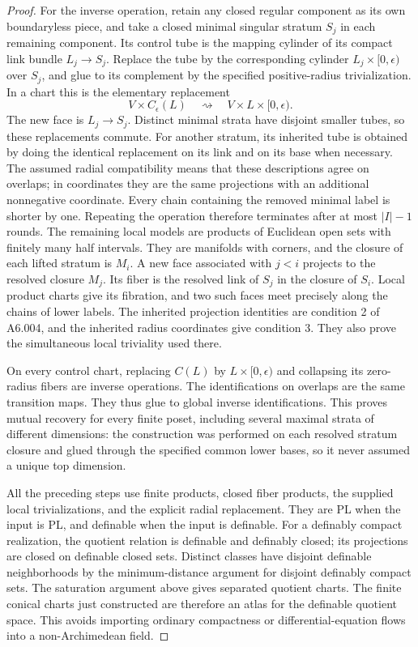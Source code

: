 \begin{proof}
For the inverse operation, retain any closed regular component
as its own boundaryless piece, and take a closed minimal singular
stratum $S_j$ in each remaining component.
Its control tube is the mapping cylinder of its compact link
bundle $L_j\to S_j$. Replace the tube by the corresponding
cylinder $L_j\times[0,\epsilon)$ over $S_j$, and glue to its
complement by the specified positive-radius trivialization.
In a chart this is the elementary replacement
\[
 V\times C_{\epsilon}(L)\quad\rightsquigarrow\quad
 V\times L\times[0,\epsilon).
\]
The new face is $L_j\to S_j$. Distinct minimal strata have
disjoint smaller tubes, so these replacements commute.
For another stratum, its inherited tube is obtained by doing
the identical replacement on its link and on its base when
necessary. The assumed radial compatibility means that these
descriptions agree on overlaps; in coordinates they are the same
projections with an additional nonnegative coordinate.
Every chain containing the removed minimal label is shorter by
one. Repeating the operation therefore terminates after at most
$|I|-1$ rounds. The remaining local models are products of
Euclidean open sets with finitely many half intervals. They are
manifolds with corners, and the closure of each lifted stratum
is $M_i$. A new face associated with $j<i$ projects to the
resolved closure $M_j$. Its fiber is the resolved link of $S_j$
in the closure of $S_i$. Local product charts give its fibration,
and two such faces meet precisely along the chains of lower
labels. The inherited projection identities are condition 2
of A6.004, and the inherited radius coordinates give condition 3.
They also prove the simultaneous local triviality used there.

On every control chart, replacing $C(L)$ by $L\times[0,\epsilon)$
and collapsing its zero-radius fibers are inverse operations.
The identifications on overlaps are the same transition maps.
They thus glue to global inverse identifications. This proves
mutual recovery for every finite poset, including several maximal
strata of different dimensions: the construction was performed
on each resolved stratum closure and glued through the specified
common lower bases, so it never assumed a unique top dimension.

All the preceding steps use finite products, closed fiber products,
the supplied local trivializations, and the explicit radial
replacement. They are PL when the input is PL, and definable
when the input is definable. For a definably compact realization,
the quotient relation is definable and definably closed; its
projections are closed on definable closed sets. Distinct classes
have disjoint definable neighborhoods by the minimum-distance
argument for disjoint definably compact sets. The saturation
argument above gives separated quotient charts. The finite
conical charts just constructed are therefore an atlas for the
definable quotient space. This avoids importing ordinary compactness
or differential-equation flows into a non-Archimedean field.


\end{proof}
